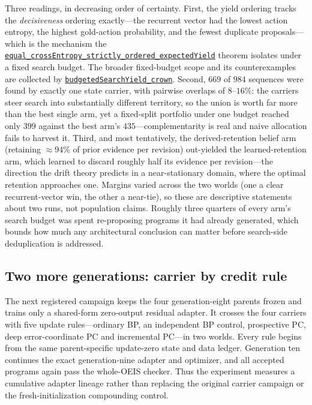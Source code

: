 \documentclass[11pt]{article}
\newcommand{\formalcommit}{f3a31db36bb2f944312ee31c1d86c2758109e83a}
\newcommand{\formalblob}{https://github.com/zariuq/MeTTapedia/blob/\formalcommit/lean/mettapedia/Mettapedia}
\newcommand{\leansource}[3]{%
  \href{\formalblob/#1\#L#2}{\nolinkurl{#3}}}
\begin{document}
Three readings, in decreasing order of certainty. First, the yield ordering tracks the
\emph{decisiveness} ordering exactly---the recurrent vector had the lowest action entropy,
the highest gold-action probability, and the fewest duplicate proposals---which is the
mechanism the
\leansource{MachineLearning/SearchGuidance/DecisivenessYield.lean}{242-L248}{equal_crossEntropy_strictly_ordered_expectedYield}
theorem isolates under a fixed search budget. The broader fixed-budget scope and its
counterexamples are collected by
\leansource{MachineLearning/SearchGuidance/BudgetedCoverageCrown.lean}{102-L130}{budgetedSearchYield_crown}.
Second, $669$ of $984$ sequences were found by exactly one state carrier, with pairwise
overlaps of $8$--$16\%$: the carriers steer search into substantially different territory,
so the union is worth far more than the best single arm, yet a fixed-split portfolio
under one budget reached only $399$ against the best arm's $435$---complementarity is
real and naive allocation fails to harvest it. Third, and most tentatively, the
derived-retention belief arm (retaining $\approx 94\%$ of prior evidence per revision)
out-yielded the learned-retention arm, which learned to discard roughly half its evidence
per revision---the direction the drift theory predicts in a near-stationary domain, where
the optimal retention approaches one. Margins varied across the two worlds (one a clear
recurrent-vector win, the other a near-tie), so these are descriptive statements about
two runs, not population claims. Roughly three quarters of every arm's search budget was
spent re-proposing programs it had already generated, which bounds how much any
architectural conclusion can matter before search-side deduplication is addressed.

\subsection{Two more generations: carrier by credit rule}
\label{sec:credit-factorial}

The next registered campaign keeps the four generation-eight parents frozen and trains
only a shared-form zero-output residual adapter. It crosses the four carriers with five
update rules---ordinary BP, an independent BP control, prospective PC, deep
error-coordinate PC and incremental PC---in two worlds. Every rule begins from the same
parent-specific update-zero state and data ledger. Generation ten continues the exact
generation-nine adapter and optimizer, and all accepted programs again pass the
whole-OEIS checker. Thus the experiment measures a cumulative adapter lineage rather
than replacing the original carrier campaign or the fresh-initialization compounding
control.
\end{document}
